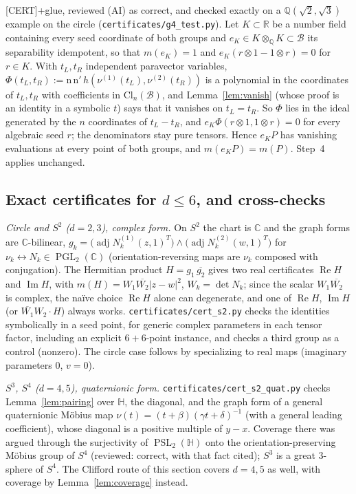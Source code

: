 \documentclass[11pt]{amsart}
\newcommand{\st}[1]{\textsf{[#1]}}
\newcommand{\Q}{\mathbb{Q}}
\newcommand{\R}{\mathbb{R}}
\newcommand{\C}{\mathbb{C}}
\newcommand{\HH}{\mathbb{H}}
\newcommand{\Cl}{\mathrm{Cl}}
\newcommand{\Rea}{\operatorname{Re}}
\newcommand{\BB}{\mathscr{B}}
\DeclareMathOperator{\PGL}{PGL}
\DeclareMathOperator{\PSL}{PSL}
\DeclareMathOperator{\adj}{adj}
\theoremstyle{plain}
\theoremstyle{definition}
\begin{document}
\st{CERT}+glue, reviewed (AI) as correct, and checked exactly on a $\Q(\sqrt2,\sqrt3)$ example on the
circle (\texttt{certificates/g4\_test.py}). Let $K\subset\R$ be a number field containing every seed
coordinate of both groups and $e_K\in K\otimes_\Q K\subset\BB$ its separability idempotent, so that
$m(e_K)=1$ and $e_K(r\otimes1-1\otimes r)=0$ for $r\in K$. With $t_L,t_R$ independent paravector
variables, $\Phi(t_L,t_R):=\mathrm n\,\mathrm n'\,h(\nu^{(1)}(t_L),\nu^{(2)}(t_R))$ is a polynomial in the
coordinates of $t_L,t_R$ with coefficients in $\Cl_n(\BB)$, and Lemma~\ref{lem:vanish} (whose proof is
an identity in a symbolic $t$) says that it vanishes on $t_L=t_R$. So $\Phi$ lies in the ideal
generated by the $n$ coordinates of $t_L-t_R$, and $e_K\Phi(r\otimes1,1\otimes r)=0$ for every algebraic
seed $r$; the denominators stay pure tensors. Hence $e_KP$ has vanishing evaluations at every point of
both groups, and $m(e_KP)=m(P)$. Step~4 applies unchanged.

\subsection{Exact certificates for $d\le6$, and cross-checks}\label{sec:lowdim}

\noindent\emph{Circle and $S^2$ ($d=2,3$), complex form.} On $S^2$ the chart is $\C$ and the graph
forms are $\C$-bilinear, $g_k=\bigl(\adj N_k^{(1)}(z,1)^T\bigr)\wedge\bigl(\adj N_k^{(2)}(w,1)^T\bigr)$ for
$\nu_k\leftrightarrow N_k\in\PGL_2(\C)$ (orientation-reversing maps are $\nu_k$ composed with
conjugation). The Hermitian product $H=g_1\,\overline{g_2}$ gives two real
certificates $\Rea H$ and $\operatorname{Im}H$, with $m(H)=W_1\overline{W_2}|z-w|^2$, $W_k=\det N_k$;
since the scalar $W_1\overline{W_2}$ is complex, the na\"ive choice $\Rea H$ alone can degenerate,
and one of $\Rea H$, $\operatorname{Im}H$ (or $\overline{W_1}W_2\cdot H$) always works.
\texttt{certificates/cert\_s2.py} checks the identities symbolically in a seed point, for generic complex
parameters in each tensor factor, including an explicit $6+6$-point instance, and checks a third group
as a control (nonzero). The circle case follows by specializing to real maps (imaginary parameters
$0$, $v=0$).

\noindent\emph{$S^3$, $S^4$ ($d=4,5$), quaternionic form.} \texttt{certificates/cert\_s2\_quat.py} checks
Lemma~\ref{lem:pairing} over $\HH$, the diagonal, and the graph form of a general quaternionic
M\"obius map $\nu(t)=(t+\beta)(\gamma t+\delta)^{-1}$ (with a general leading coefficient), whose
diagonal is a positive multiple of $y-x$. Coverage there was argued through the surjectivity of
$\PSL_2(\HH)$ onto the orientation-preserving M\"obius group of $S^4$ \cite{Wilker} (reviewed:
correct, with that fact cited); $S^3$ is a great $3$-sphere of $S^4$. The Clifford route of this
section covers $d=4,5$ as well, with coverage by Lemma~\ref{lem:coverage} instead.
\end{document}
